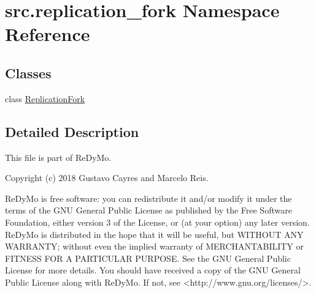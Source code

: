 \hypertarget{namespacesrc_1_1replication__fork}{}\section{src.\+replication\+\_\+fork Namespace Reference}
\label{namespacesrc_1_1replication__fork}
\subsection*{Classes}
\begin{DoxyCompactItemize}
\item 
class \mbox{\hyperlink{classsrc_1_1replication__fork_1_1ReplicationFork}{Replication\+Fork}}
\end{DoxyCompactItemize}


\subsection{Detailed Description}
\begin{DoxyVerb}This file is part of ReDyMo.

  Copyright (c) 2018  Gustavo Cayres and Marcelo Reis.

  ReDyMo is free software: you can redistribute it and/or modify it
  under the terms of the GNU General Public License as published by the
  Free Software Foundation, either version 3 of the License, or (at your
  option) any later version.
  ReDyMo is distributed in the hope that it will be useful, but WITHOUT
  ANY WARRANTY; without even the implied warranty of MERCHANTABILITY or
  FITNESS FOR A PARTICULAR PURPOSE. See the GNU General Public License
  for more details.
  You should have received a copy of the GNU General Public License along
  with ReDyMo. If not, see <http://www.gnu.org/licenses/>.
\end{DoxyVerb}
 